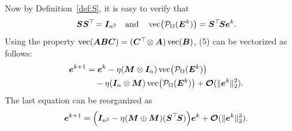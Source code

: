 \documentclass{article}
\def\P{{\cal P}}
\newcommand{\norm}[1]{\|#1\|} %
\DeclareMathOperator*{\vect}{vec}
\newcommand{\topnew}{\top \hspace{-0.05cm}}
\begin{document}
Now by Definition~\ref{def:S}, it is easy to verify that
$$ \bm S \bm S^\topnew = \bm I_{n^2} \quad \text{and} \quad \vect\bigl(\P_\Omega (\bm E^k)\bigr) = \bm S^\topnew \bm S \bm e^k .$$
Using the property %
$\vect(\bm A \bm B \bm C) = (\bm C^\topnew \otimes \bm A) \vect(\bm B)$, (5) can be vectorized as follows: 
\begin{align*}
    \bm e^{k+1} &= \bm e^k - \eta (\bm M \otimes \bm I_n) \vect\bigl(\P_\Omega (\bm E^k)\bigr) \\
    &\quad - \eta (\bm I_n \otimes \bm M) \vect\bigl(\P_\Omega (\bm E^k)\bigr) + \bm{\mathcal{O}}(\norm{\bm e^k}_2^2) .
\end{align*}
The last equation can be reorganized as
\begin{align*}
    \bm e^{k+1} = \Bigl( \bm I_{n^2} - \eta (\bm M \oplus \bm M) (\bm S^\topnew \bm S) \Bigr) \bm e^k + \bm{\mathcal{O}}(\norm{\bm e^k}_2^2) .
\end{align*}











\end{document}
